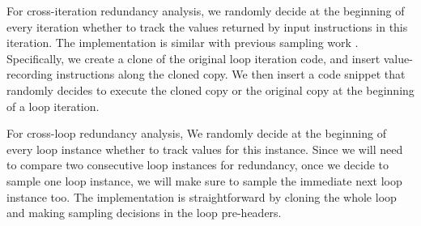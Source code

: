 For cross-iteration redundancy analysis,
we randomly decide at the
beginning of every iteration whether to track the values returned by
input instructions in this iteration.
The implementation is similar with previous sampling work 
\cite{liblit03,liblit05}.
Specifically, we create a clone of the original
loop iteration code, 
and insert value-recording instructions along the
cloned copy. 
We then insert a code snippet that randomly decides to execute the
cloned copy or the original copy at the beginning of a loop iteration. 


For cross-loop redundancy analysis,
We randomly decide at the beginning
of every loop instance whether to track values for this instance. 
Since we will need to compare two consecutive loop
instances for redundancy, once we decide to sample one loop instance, we will
make sure to sample the immediate next loop instance too.
The implementation is straightforward by cloning the whole loop and making
sampling decisions in the loop pre-headers.





